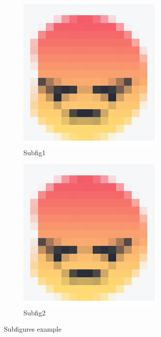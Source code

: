 \documentclass{article}
\begin{document}
        \begin{figure}[H]
            \begin{subfigure}[H]{0.19\linewidth} %
                \includegraphics[width=\linewidth]{angery.png}
                \caption{Subfig1}
            \end{subfigure}
            \begin{subfigure}[H]{0.8\linewidth}
                \includegraphics[width=\linewidth]{angery.png}
                \caption{Subfig2}
            \end{subfigure}
            \caption{Subfigures example}
            \label{fig:subAngeries}
        \end{figure}
\end{document}
